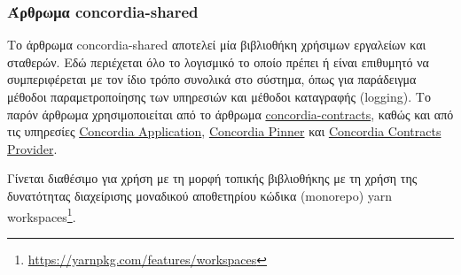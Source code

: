 \subsubsection{Άρθρωμα concordia-shared} \label{subsubsection:4-3-1-1-concordia-shared-module}

Το άρθρωμα concordia-shared αποτελεί μία βιβλιοθήκη χρήσιμων εργαλείων και σταθερών. Εδώ περιέχεται όλο το λογισμικό το οποίο πρέπει ή είναι επιθυμητό να συμπεριφέρεται με τον ίδιο τρόπο συνολικά στο σύστημα, όπως για παράδειγμα μέθοδοι παραμετροποίησης των υπηρεσιών και μέθοδοι καταγραφής (logging). Το παρόν άρθρωμα χρησιμοποιείται από το άρθρωμα \hyperref[subsubsection:4-3-1-2-concordia-contracts-module]{concordia-contracts}, καθώς και από τις υπηρεσίες \hyperref[subsection:4-3-2-concordia-application-service]{Concordia Application}, \hyperref[subsection:4-3-4-concordia-pinner-service]{Concordia Pinner} και \hyperref[subsection:4-3-5-concordia-contracts-provider-service]{Concordia Contracts Provider}.

Γίνεται διαθέσιμο για χρήση με τη μορφή τοπικής βιβλιοθήκης με τη χρήση της δυνατότητας διαχείρισης μοναδικού αποθετηρίου κώδικα (monorepo) yarn workspaces{\footnote{\url{https://yarnpkg.com/features/workspaces}}}.